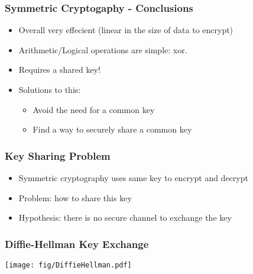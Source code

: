 \documentclass[
hyperref={pdfpagelabels=false}
,xcolor=table
]
{beamer}
\newcommand{\plus}{{\texttt{[image: plus.png]}}}
\newcommand{\minus}{{\texttt{[image: minus.png]}}}
\begin{document}
\begin{frame}
  \frametitle{Symmetric Cryptogaphy - Conclusions}

  \begin{itemize}
  \item[\plus] Overall very effecient (linear in the size of data to encrypt)
  \item[\plus] Arithmetic/Logical operations are simple: xor. 
  \item[\minus] Requires a shared key! 
  \item Solutions to this:
    \begin{itemize}
    \item Avoid the need for a common key
    \item Find a way to securely share a common key
    \end{itemize}
  \end{itemize}
\end{frame}






\begin{frame}
  \frametitle{Key Sharing Problem}
  \begin{itemize}
  \item Symmetric cryptography uses same key to encrypt and decrypt
  \item Problem: how to share this key
  \item Hypothesis: there is no secure channel to exchange the key
  \end{itemize}
\end{frame}


\begin{frame}
  \frametitle{Diffie-Hellman Key Exchange}
  \begin{center}
    \texttt{[image: fig/DiffieHellman.pdf]}
  \end{center}
\end{frame}
\end{document}
